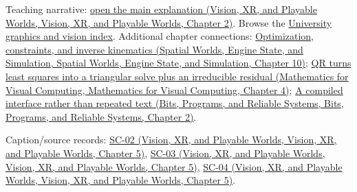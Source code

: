 Teaching narrative: \href{../07-Vision-XR-and-Playable-Worlds/main.pdf\#nameddest=04-visual-computing-ii-ch031-learning-a-visual-classifier-from-examples}{open the main explanation (Vision, XR, and Playable Worlds, Vision, XR, and Playable Worlds, Chapter 2)}. Browse the \hyperref[appendix-a6d556a4ef50-university-graphics-vision-and-photography---independent-series]{University graphics and vision index}. Additional chapter connections: \href{../05-Spatial-Worlds-Engine-State-and-Simulation/main.pdf\#nameddest=04-visual-computing-ii-ch029-optimization-constraints-and-inverse-kinematics}{Optimization, constraints, and inverse kinematics (Spatial Worlds, Engine State, and Simulation, Spatial Worlds, Engine State, and Simulation, Chapter 10)}; \href{../02-Mathematics-for-Visual-Computing/main.pdf\#nameddest=01-foundations-i-ch020-qr-turns-least-squares-into-a-triangular-solve-plus-an-irreducible-residual}{QR turns least squares into a triangular solve plus an irreducible residual (Mathematics for Visual Computing, Mathematics for Visual Computing, Chapter 4)}; \href{../01-Bits-Programs-and-Reliable-Systems/main.pdf\#nameddest=01-foundations-i-ch002-a-compiled-interface-rather-than-repeated-text}{A compiled interface rather than repeated text (Bits, Programs, and Reliable Systems, Bits, Programs, and Reliable Systems, Chapter 2)}.

Caption/source records: \href{../07-Vision-XR-and-Playable-Worlds/main.pdf\#nameddest=04-visual-computing-ii-ch036-sc-02---stanford-cs231n-spring-2025-lecture-2-image-classification-with-linear-classifiers}{SC-02 (Vision, XR, and Playable Worlds, Vision, XR, and Playable Worlds, Chapter 5)}, \href{../07-Vision-XR-and-Playable-Worlds/main.pdf\#nameddest=04-visual-computing-ii-ch036-sc-03---stanford-cs231n-spring-2025-lecture-3-regularization-and-optimization}{SC-03 (Vision, XR, and Playable Worlds, Vision, XR, and Playable Worlds, Chapter 5)}, \href{../07-Vision-XR-and-Playable-Worlds/main.pdf\#nameddest=04-visual-computing-ii-ch036-sc-04---stanford-cs231n-spring-2025-lecture-4-neural-networks-and-backpropagation}{SC-04 (Vision, XR, and Playable Worlds, Vision, XR, and Playable Worlds, Chapter 5)}.
